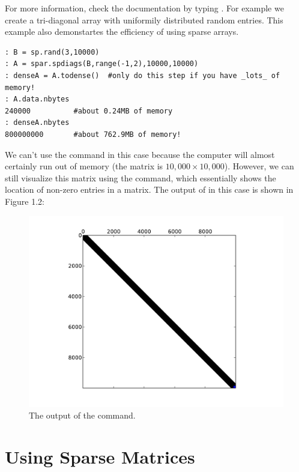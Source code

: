 For more information, check the documentation by typing . For example we create a tri-diagonal array with uniformily distributed random entries.  This example also demonstartes the efficiency of using sparse arrays.
\begin{lstlisting}[style=python]
: B = sp.rand(3,10000)
: A = spar.spdiags(B,range(-1,2),10000,10000)
: denseA = A.todense()  #only do this step if you have _lots_ of memory!
: A.data.nbytes
240000          #about 0.24MB of memory
: denseA.nbytes
800000000       #about 762.9MB of memory!
\end{lstlisting}


We can't use the  command in this case because the computer will almost certainly run out of memory (the matrix is $10,\!000 \times 10,\!000$). However, we can still visualize this matrix using the  command, which essentially shows the location of non-zero entries in a matrix. The output of  in this case is shown in Figure 1.2:

\begin{figure}[h!]
\begin{center}
\includegraphics[scale = .5]{./Figures/spy}
\end{center}
\caption{The output of the  command.}
\end{figure}

\section*{Using Sparse Matrices}

